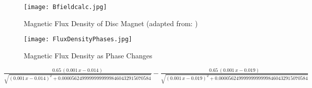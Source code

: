 \begin{figure}[H]
	\begin{center}
		\texttt{[image: Bfieldcalc.jpg]}
		\caption{Magnetic Flux Density of Disc Magnet (adapted from: \citep{Supermagnete:2010})}
		\label{fig:B0}
	\end{center}
\end{figure}

\begin{figure}[H]
	\begin{center}
		\texttt{[image: FluxDensityPhases.jpg]}
		\caption{Magnetic Flux Density as Phase Changes}
		\label{fig:fluxD0}
	\end{center}
\end{figure}


$\frac{0.65\,{\left(0.001\,x-0.014\right)}}{\sqrt{{{\left(0.001\,x-0.014\right)}}^2 +0.000056249999999999998460432915070584}}-\frac{0.65\,{\left(0.001\,x-0.019\right)}}{\sqrt{{{\left(0.001\,x-0.019\right)}}^2 +0.000056249999999999998460432915070584}}$